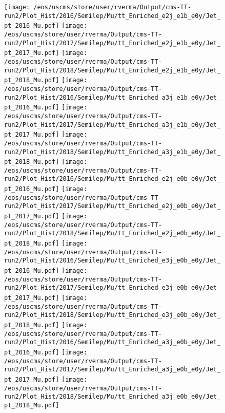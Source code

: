 \begin{figure}
\centering
\texttt{[image: /eos/uscms/store/user/rverma/Output/cms-TT-run2/Plot\_Hist/2016/Semilep/Mu/tt\_Enriched\_e2j\_e1b\_e0y/Jet\_pt\_2016\_Mu.pdf]}
\texttt{[image: /eos/uscms/store/user/rverma/Output/cms-TT-run2/Plot\_Hist/2017/Semilep/Mu/tt\_Enriched\_e2j\_e1b\_e0y/Jet\_pt\_2017\_Mu.pdf]}
\texttt{[image: /eos/uscms/store/user/rverma/Output/cms-TT-run2/Plot\_Hist/2018/Semilep/Mu/tt\_Enriched\_e2j\_e1b\_e0y/Jet\_pt\_2018\_Mu.pdf]}
\texttt{[image: /eos/uscms/store/user/rverma/Output/cms-TT-run2/Plot\_Hist/2016/Semilep/Mu/tt\_Enriched\_a3j\_e1b\_e0y/Jet\_pt\_2016\_Mu.pdf]}
\texttt{[image: /eos/uscms/store/user/rverma/Output/cms-TT-run2/Plot\_Hist/2017/Semilep/Mu/tt\_Enriched\_a3j\_e1b\_e0y/Jet\_pt\_2017\_Mu.pdf]}
\texttt{[image: /eos/uscms/store/user/rverma/Output/cms-TT-run2/Plot\_Hist/2018/Semilep/Mu/tt\_Enriched\_a3j\_e1b\_e0y/Jet\_pt\_2018\_Mu.pdf]}
\texttt{[image: /eos/uscms/store/user/rverma/Output/cms-TT-run2/Plot\_Hist/2016/Semilep/Mu/tt\_Enriched\_e2j\_e0b\_e0y/Jet\_pt\_2016\_Mu.pdf]}
\texttt{[image: /eos/uscms/store/user/rverma/Output/cms-TT-run2/Plot\_Hist/2017/Semilep/Mu/tt\_Enriched\_e2j\_e0b\_e0y/Jet\_pt\_2017\_Mu.pdf]}
\texttt{[image: /eos/uscms/store/user/rverma/Output/cms-TT-run2/Plot\_Hist/2018/Semilep/Mu/tt\_Enriched\_e2j\_e0b\_e0y/Jet\_pt\_2018\_Mu.pdf]}
\texttt{[image: /eos/uscms/store/user/rverma/Output/cms-TT-run2/Plot\_Hist/2016/Semilep/Mu/tt\_Enriched\_e3j\_e0b\_e0y/Jet\_pt\_2016\_Mu.pdf]}
\texttt{[image: /eos/uscms/store/user/rverma/Output/cms-TT-run2/Plot\_Hist/2017/Semilep/Mu/tt\_Enriched\_e3j\_e0b\_e0y/Jet\_pt\_2017\_Mu.pdf]}
\texttt{[image: /eos/uscms/store/user/rverma/Output/cms-TT-run2/Plot\_Hist/2018/Semilep/Mu/tt\_Enriched\_e3j\_e0b\_e0y/Jet\_pt\_2018\_Mu.pdf]}
\texttt{[image: /eos/uscms/store/user/rverma/Output/cms-TT-run2/Plot\_Hist/2016/Semilep/Mu/tt\_Enriched\_a3j\_e0b\_e0y/Jet\_pt\_2016\_Mu.pdf]}
\texttt{[image: /eos/uscms/store/user/rverma/Output/cms-TT-run2/Plot\_Hist/2017/Semilep/Mu/tt\_Enriched\_a3j\_e0b\_e0y/Jet\_pt\_2017\_Mu.pdf]}
\texttt{[image: /eos/uscms/store/user/rverma/Output/cms-TT-run2/Plot\_Hist/2018/Semilep/Mu/tt\_Enriched\_a3j\_e0b\_e0y/Jet\_pt\_2018\_Mu.pdf]}
\end{figure}

